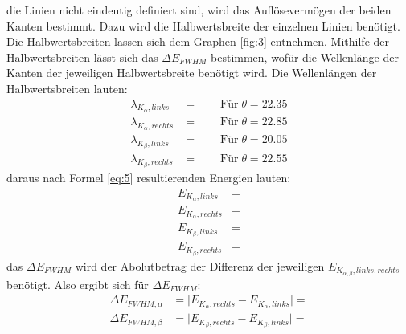     \justifying die Linien nicht eindeutig definiert sind, wird das Auflösevermögen der beiden Kanten bestimmt. Dazu wird die 
    Halbwertsbreite der einzelnen Linien benötigt. Die Halbwertsbreiten lassen sich dem Graphen \ref{fig:3} entnehmen. Mithilfe der 
    Halbwertsbreiten lässt sich das $\Delta E_{FWHM}$ bestimmen, wofür die Wellenlänge der Kanten der jeweiligen Halbwertsbreite benötigt wird. 
    Die Wellenlängen der Halbwertsbreiten lauten:
    \begin{subequations}\label{eq:14}
    \begin{align}
        \lambda_{K_{\alpha},links} &= \text{} \qquad \text{Für}\;\theta = 22.35 \label{eq:14a}\\
        \lambda_{K_{\alpha},rechts} &= \text{} \qquad \text{Für}\;\theta = 22.85 \label{eq:14b}\\
        \lambda_{K_{\beta},links} &= \text{} \qquad \text{Für}\;\theta = 20.05 \label{eq:14c}\\
        \lambda_{K_{\beta},rechts} &= \text{} \qquad \text{Für}\;\theta = 22.55 \label{eq:14d}
    \end{align}
    \end{subequations}
    \justifying daraus nach Formel \eqref{eq:5} resultierenden Energien lauten:
    \begin{subequations}\label{eq:15}
    \begin{align}
        E_{K_{\alpha},links} &= \text{} \label{eq:15a}\\
        E_{K_{\alpha},rechts} &= \text{} \label{eq:15b}\\
        E_{K_{\beta},links} &= \text{} \label{eq:15c}\\
        E_{K_{\beta},rechts} &= \text{} \label{eq:15d}
    \end{align}
    \end{subequations}
    \justifying das $\Delta E_{FWHM}$ wird der Abolutbetrag der Differenz der jeweiligen $E_{K_{\alpha,\beta},links,rechts}$ benötigt.
    Also ergibt sich für $\Delta E_{FWHM}$:
    \begin{subequations}\label{eq:16}
    \begin{align}
        \Delta E_{FWHM, \alpha} &= \vert E_{K_{\alpha},rechts}-E_{K_{\alpha},links} \vert = \text{} \label{eq:16a}\\
        \Delta E_{FWHM, \beta} &= \vert E_{K_{\beta},rechts}-E_{K_{\beta},links} \vert = \text{} \label{eq:16b}
    \end{align}
    \end{subequations}
